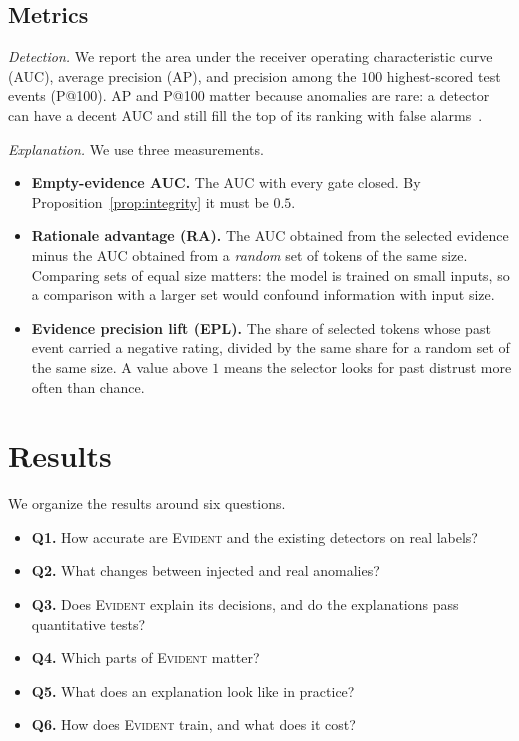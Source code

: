 \documentclass[pdflatex,sn-basic]{sn-jnl}
\newcommand{\evident}{\textsc{Evident}}
\theoremstyle{definition}
\theoremstyle{plain}
\begin{document}
\subsection{Metrics}
\emph{Detection.} We report the area under the receiver operating characteristic curve (AUC), average
precision (AP), and precision among the $100$ highest-scored test events
(P@100). AP and P@100 matter because anomalies are rare: a detector can have
a decent AUC and still fill the top of its ranking with false
alarms~\cite{davis2006}.

\emph{Explanation.} We use three measurements.
\begin{itemize}
\item \textbf{Empty-evidence AUC.} The AUC with every gate closed. By
Proposition~\ref{prop:integrity} it must be $0.5$.
\item \textbf{Rationale advantage (RA).} The AUC obtained from the selected
evidence minus the AUC obtained from a \emph{random} set of tokens of the same
size. Comparing sets of equal size matters: the model is trained on small
inputs, so a comparison with a larger set would confound information with
input size.
\item \textbf{Evidence precision lift (EPL).} The share of selected tokens
whose past event carried a negative rating, divided by the same share for a
random set of the same size. A value above $1$ means the selector looks for
past distrust more often than chance.
\end{itemize}

\section{Results}
\label{sec:results}
We organize the results around six questions.
\begin{itemize}
\item \textbf{Q1.} How accurate are \evident{} and the existing detectors on
real labels?
\item \textbf{Q2.} What changes between injected and real anomalies?
\item \textbf{Q3.} Does \evident{} explain its decisions, and do the
explanations pass quantitative tests?
\item \textbf{Q4.} Which parts of \evident{} matter?
\item \textbf{Q5.} What does an explanation look like in practice?
\item \textbf{Q6.} How does \evident{} train, and what does it cost?
\end{itemize}
\end{document}
